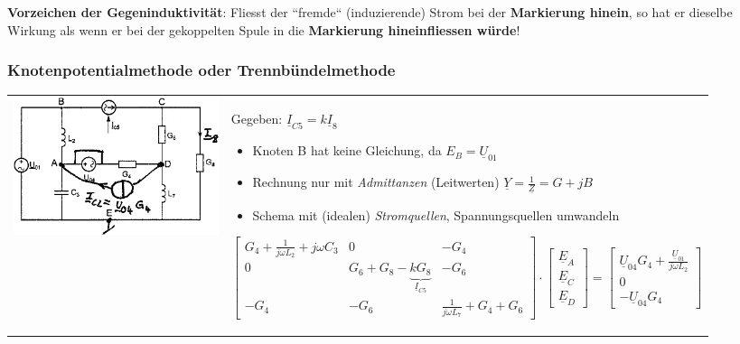 \textbf{Vorzeichen der Gegeninduktivität}: 
Fliesst der ``fremde`` (induzierende) Strom bei der \textbf{Markierung hinein}, so hat er dieselbe
Wirkung als wenn er bei der gekoppelten Spule in die \textbf{Markierung
hineinfliessen würde}! 


\subsubsection{Knotenpotentialmethode oder Trennbündelmethode}
\begin{tabular}{ll}
\parbox{6cm}{\includegraphics[width=6cm]{./images/netzwerkanalyse-knotenpotential.png}
	}
	& \parbox{12cm}{
	Gegeben: $\underline{I}_{C5} = k \underline{I}_8$
	\begin{itemize}
      \item Knoten B hat keine Gleichung, da $E_B = \underline{U}_{01}$
      \item Rechnung nur mit \textit{Admittanzen} (Leitwerten) $\underline{Y}
      = \frac{1}{\underline{Z}} = G + jB$
      \item Schema mit (idealen) \textit{Stromquellen}, Spannungsquellen
      umwandeln
    \end{itemize}
$$\begin{bmatrix}
    G_4 + \frac{1}{j \omega L_2} + j \omega C_3 & 0 & -G_4 \\
    0 & G_6 + G_8 - \underbrace{k G_8}_{\underline{I}_{C5}} & -G_6 \\
    -G_4 & -G_6 & \frac{1}{j \omega L_7} + G_4 + G_6   
	\end{bmatrix} \cdot
\begin{bmatrix}
    \underline{E}_A \\ \underline{E}_C \\ \underline{E}_D
    \end{bmatrix} =
\begin{bmatrix}
    \underline{U}_{04} G_4 + \frac{\underline{U}_{01} }{j \omega L_2}\\ 
    0 \\
    -\underline{U}_{04} G_4 \end{bmatrix}$$    
	}
\end{tabular}

